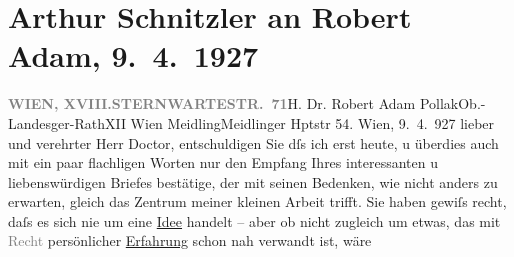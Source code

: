 

               \section[Arthur Schnitzler an Robert Adam, 9. 4. 1927]{ Arthur Schnitzler an Robert Adam, 9. 4. 1927}\nopagebreak{}\rehead{ }\begin{ledgroupsized}[t]{13cm}\normalsize\beginnumbering{} \toendnotes[C]{\smallbreak\pagebreak[2]} 
\toendnotes[C]{\smallbreak}\pstart{}{\pb}\label{T_L02484-1v}\label{T_L02484-1h}\pend{}\pstart{}\textcolor{gray}{\textbf{WIEN, XVIII.}}\pend{}\pstart{}\textcolor{gray}{\textbf{STERNWARTESTR. 71}}\pend{}{\bigskip}\pstart{}H. Dr. Robert Adam Pollak\pend{}\pstart{}Ob.-Landesger-Rath\pend{}\pstart{}XII Wien Meidling\pend{}\pstart{}Meidlinger Hptstr 54.\pend{}{\bigskip}\pstart
           \raggedleft{}{\pb}Wien, 9. 4. 927\pend
           \pstart
           lieber und verehrter Herr Doctor, entschuldigen Sie dſs ich
                    erst heute, u überdies auch mit ein paar flachligen Worten nur den Empfang Ihres
                    interessanten u liebenswürdigen Briefes bestätige, der mit seinen Bedenken, wie
                    nicht anders zu erwarten, gleich das Zentrum meiner kleinen Arbeit trifft. Sie haben gewiſs recht,
                    daſs es sich nie um eine \uline{Idee} handelt – aber ob
                    nicht zugleich um etwas, das mit \textcolor{gray}{Recht} persönlicher \uline{Erfahrung} schon nah verwandt ist, wäre

\end{ledgroupsized}
